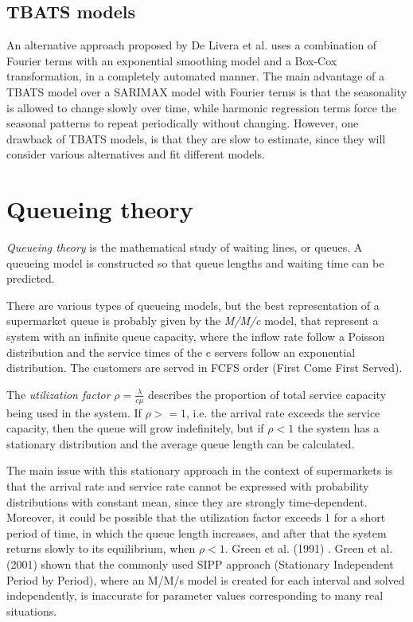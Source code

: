 \subsection{TBATS models}
\label{subsec:tbats_models}
An alternative approach proposed by De Livera et al. \cite{de_livera} uses a combination of Fourier terms with an exponential smoothing model and a Box-Cox transformation, in a completely automated manner. The main advantage of a TBATS model over a SARIMAX model with Fourier terms is that the seasonality is allowed to change slowly over time, while harmonic regression terms force the seasonal patterns to repeat periodically without changing. However, one drawback of TBATS models, is that they are slow to estimate, since they will consider various alternatives and fit different models.


\section{Queueing theory}
\label{sec:queueing_theory}

\emph{Queueing theory} is the mathematical study of waiting lines, or queues. A queueing model is constructed so that queue lengths and waiting time can be predicted.

There are various types of queueing models, but the best representation of a supermarket queue is probably given by the \emph{M/M/c} model, that represent a system with an infinite queue capacity, where the inflow rate follow a Poisson distribution and the service times of the c servers follow an exponential distribution. The customers are served in FCFS order (First Come First Served).

The \emph{utilization factor} \( \rho = \frac{\lambda}{c\mu} \) describes the proportion of total service capacity being used in the system. If \( \rho >= 1\), i.e. the arrival rate exceeds the service capacity, then the queue will grow indefinitely, but if \( \rho < 1\) the system has a stationary distribution and the average queue length can be calculated.

The main issue with this stationary approach in the context of supermarkets is that the arrival rate and service rate cannot be expressed with probability distributions with constant mean, since they are strongly time-dependent. Moreover, it could be possible that the utilization factor exceeds 1 for a short period of time, in which the queue length increases, and after that the system returns slowly to its equilibrium, when \( \rho < 1\). Green et al. (1991) . Green et al. (2001) \cite{green2001} shown that the commonly used SIPP approach (Stationary Independent Period by Period), where an M/M/s model is created for each interval and solved independently, is inaccurate for parameter values corresponding to many real situations.

